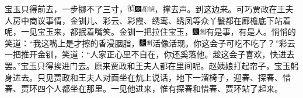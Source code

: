 宝玉只得前去，一步挪不了三寸，\includegraphics[width=9.4pt,height=9.4pt,align=c,vshift=1pt]{../images/00015}{\includegraphics[width=3mm]{../Images/00004}\includegraphics[width=3mm]{../Images/00010}\footnotesize \kaishu \includegraphics[width=3mm]{../images/00016}，撑去声。}到这边来。可巧贾政在王夫人房中商议事情，金钏儿、彩云、彩霞、绣鸾、绣凤等众丫鬟都在廊檐底下站着呢，一见宝玉来，都抿着嘴笑。金钏一把拉住宝玉，{\includegraphics[width=3mm]{../Images/00004}\includegraphics[width=3mm]{../Images/00011}\footnotesize \kaishu 有是事，有是人。}悄悄的笑道：“我这嘴上是才擦的香浸胭脂，{\includegraphics[width=3mm]{../Images/00004}\includegraphics[width=3mm]{../Images/00011}\footnotesize \kaishu 活像活现。}你这会子可吃不吃了？”彩云一把推开金钏，笑道：“人家正心里不自在，你还奚落他。趁这会子喜欢，快进去罢。”宝玉只得挨进门去。原来贾政和王夫人都在里间呢。赵姨娘打起帘子，宝玉躬身进去。只见贾政和王夫人对面坐在炕上说话，地下一溜椅子，迎春、探春、惜春、贾环四个人都坐在那里。一见他进来，惟有探春和惜春、贾环站了起来。

